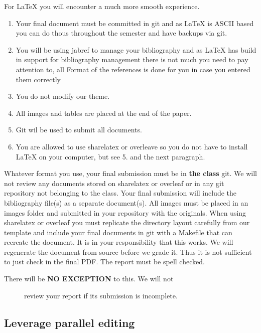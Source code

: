 For LaTeX you will encounter a much more smooth experience.

\begin{enumerate}
\def\labelenumi{\arabic{enumi}.}

\item
  Your final document must be committed in git and as LaTeX is ASCII
  based you can do thous throughout the semester and have backups via
  git.
\item
  You will be using jabref to manage your bibliography and as LaTeX has
  build in support for bibliography management there is not much you
  need to pay attention to, all Format of the references is done for you
  in case you entered them correctly
\item
  You do not modify our theme.
\item
  All images and tables are placed at the end of the paper.
\item
  Git wil be used to submit all documents.
\item
  You are allowed to use sharelatex or overleave so you do not have to
  install LaTeX on your computer, but see 5. and the next paragraph.
\end{enumerate}

Whatever format you use, your final submission must be in \textbf{the
class} git. We will not review any documents stored on sharelatex or
overleaf or in any git repository not belonging to the class. Your final
submission will include the bibliography file(s) as a separate
document(s). All images must be placed in an images folder and submitted
in your repository with the originals. When using sharelatex or overleaf
you must replicate the directory layout carefully from our template and
include your final documents in git with a Makefile that can recreate
the document. It is in your responsibility that this works. We will
regenerate the document from source before we grade it. Thus it is not
sufficient to just check in the final PDF. The report must be spell
checked.

\begin{description}
\item[There will be \textbf{NO EXCEPTION} to this. We will not]
review your report if its submission is incomplete.
\end{description}

\subsection{Leverage parallel editing}\label{leverage-parallel-editing}

